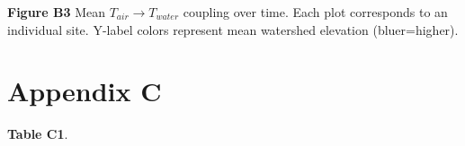 \documentclass[notitlepage]{article}
\begin{document}
\begin{center}
\end{center}
\textbf{Figure B3} Mean $T_{air}\rightarrow T_{water}$ coupling over time. Each plot corresponds to an individual site. Y-label colors represent mean watershed elevation (bluer=higher).

\section*{Appendix C}

\textbf{Table C1}.
\begin{landscape}
\clearpage
{}
\end{landscape}
\end{document}
